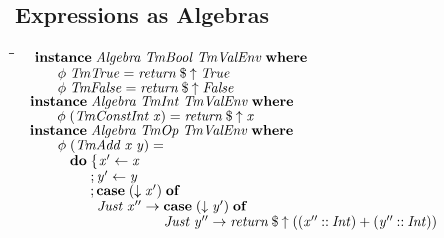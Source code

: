 \documentclass[10pt]{article}
\newlength{\lwidth}\setlength{\lwidth}{4.5cm}
\newlength{\cwidth}\setlength{\cwidth}{8mm} %
\newcommand{\Conid}[1]{\mathit{#1}}
\newcommand{\Varid}[1]{\mathit{#1}}
\begin{document}
\subsection{Expressions as Algebras}

\begin{tabbing}
\qquad\=\hspace{\lwidth}\=\hspace{\cwidth}\=\+\kill
${\hskip1.00em\relax\mathbf{instance}\;\Conid{Algebra}\;\Conid{TmBool}\;\Conid{TmValEnv}\;\mathbf{where}}$\\
${\hskip1.00em\relax\hskip2.00em\relax\Varid{\phi}\;\Conid{TmTrue}\mathrel{=}\Varid{return}\mathbin{\$}\Varid{\uparrow}\;\Conid{True}}$\\
${\hskip1.00em\relax\hskip2.00em\relax\Varid{\phi}\;\Conid{TmFalse}\mathrel{=}\Varid{return}\mathbin{\$}\Varid{\uparrow}\;\Conid{False}}$\\
${}$\\
${\hskip1.00em\relax\mathbf{instance}\;\Conid{Algebra}\;\Conid{TmInt}\;\Conid{TmValEnv}\;\mathbf{where}}$\\
${\hskip1.00em\relax\hskip2.00em\relax\Varid{\phi}\;(\Conid{TmConstInt}\;\Varid{x})\mathrel{=}\Varid{return}\mathbin{\$}\Varid{\uparrow}\;\Varid{x}}$\\
${}$\\
${\hskip1.00em\relax\mathbf{instance}\;\Conid{Algebra}\;\Conid{TmOp}\;\Conid{TmValEnv}\;\mathbf{where}}$\\
${\hskip1.00em\relax\hskip2.00em\relax\Varid{\phi}\;(\Conid{TmAdd}\;\Varid{x}\;\Varid{y})\mathrel{=}}$\\
${\hskip1.00em\relax\hskip2.00em\relax\phantom{\Varid{\phi}\;\mbox{}}\mathbf{do}\;\{\mskip1.5mu \Varid{x'}\leftarrow \Varid{x}}$\\
${\hskip1.00em\relax\hskip2.00em\relax\phantom{\Varid{\phi}\;\mbox{}}\phantom{\mathbf{do}\;\mbox{}};\Varid{y'}\leftarrow \Varid{y}}$\\
${\hskip1.00em\relax\hskip2.00em\relax\phantom{\Varid{\phi}\;\mbox{}}\phantom{\mathbf{do}\;\mbox{}};\mathbf{case}\;(\Varid{\downarrow}\;\Varid{x'})\;\mathbf{of}}$\\
${\hskip1.00em\relax\hskip2.00em\relax\phantom{\Varid{\phi}\;\mbox{}}\phantom{\mathbf{do}\;\mbox{}}\phantom{;\mbox{}}\Conid{Just}\;\Varid{x''}\to \mathbf{case}\;(\Varid{\downarrow}\;\Varid{y'})\;\mathbf{of}}$\\
${\hskip1.00em\relax\hskip2.00em\relax\phantom{\Varid{\phi}\;\mbox{}}\phantom{\mathbf{do}\;\mbox{}}\phantom{;\mbox{}}\phantom{\Conid{Just}\;\Varid{x''}\to \mbox{}}\Conid{Just}\;\Varid{y''}\to \Varid{return}\mathbin{\$}\Varid{\uparrow}\;((\Varid{x''}\mathbin{::}\Conid{Int})\mathbin{+}(\Varid{y''}\mathbin{::}\Conid{Int}))}$\\

\end{tabbing}
\end{document}
